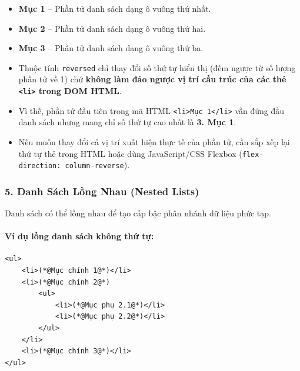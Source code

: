 \documentclass[11pt,oneside]{book}
\newcommand{\codeinline}[1]{\textcolor{accentOrange}{\texttt{#1}}}
\begin{document}
\begin{browserWindow}
\begin{itemize}[label=\textcolor{primaryBlue}{\rule{0.7ex}{0.7ex}}, leftmargin=1.5em, itemsep=3pt, parsep=0pt]
    \item \textbf{Mục 1} -- Phần tử danh sách dạng ô vuông thứ nhất.
    \item \textbf{Mục 2} -- Phần tử danh sách dạng ô vuông thứ hai.
    \item \textbf{Mục 3} -- Phần tử danh sách dạng ô vuông thứ ba.
\end{itemize}
\end{browserWindow}

\begin{noteBox}
\begin{itemize}[leftmargin=1.5em, itemsep=3pt, parsep=0pt]
    \item Thuộc tính \codeinline{reversed} chỉ thay đổi số thứ tự hiển thị (đếm ngược từ số lượng phần tử về 1) chứ \textbf{không làm đảo ngược vị trí cấu trúc của các thẻ \codeinline{<li>} trong DOM HTML}.
    \item Vì thế, phần tử đầu tiên trong mã HTML \codeinline{<li>Mục 1</li>} vẫn đứng đầu danh sách nhưng mang chỉ số thứ tự cao nhất là \textbf{3. Mục 1}.
    \item Nếu muốn thay đổi cả vị trí xuất hiện thực tế của phần tử, cần sắp xếp lại thứ tự thẻ trong HTML hoặc dùng JavaScript/CSS Flexbox (\codeinline{flex-direction: column-reverse}).
\end{itemize}
\end{noteBox}

\subsubsection{5. Danh Sách Lồng Nhau (Nested Lists)}

Danh sách có thể lồng nhau để tạo cấp bậc phân nhánh dữ liệu phức tạp.

\paragraph{Ví dụ lồng danh sách không thứ tự:}
\begin{codeWindow}
\begin{lstlisting}[language=HTML5]
<ul>
    <li>(*@Mục chính 1@*)</li>
    <li>(*@Mục chính 2@*)
        <ul>
            <li>(*@Mục phụ 2.1@*)</li>
            <li>(*@Mục phụ 2.2@*)</li>
        </ul>
    </li>
    <li>(*@Mục chính 3@*)</li>
</ul>
\end{lstlisting}
\end{codeWindow}
\end{document}
